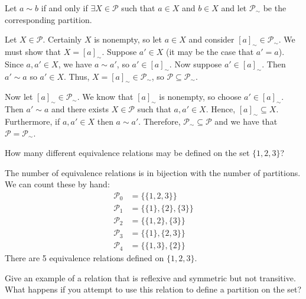 \documentclass[../../master.tex]{subfiles}
\begin{document}
  \begin{solution}
    Let \(a \sim b\) if and only if \(\exists X \in \mathscr{P}\) such that \(a
    \in X\) and \(b \in X\) and let \(\mathscr{P}_{\sim}\) be the corresponding
    partition.

    Let \(X \in \mathscr{P}\). Certainly \(X\) is nonempty, so let \(a \in X\)
    and consider \([a]_{\sim} \in \mathscr{P}_{\sim}\). We must show that \(X =
    [a]_{\sim}\). Suppose \(a' \in X\) (it may be the case that \(a' = a\)).
    Since \(a, a' \in X\), we have \(a \sim a'\), so \(a' \in [a]_{\sim}\). Now
    suppose \(a' \in [a]_{\sim}\). Then \(a' \sim a\) so \(a' \in X\). Thus,
    \(X = [a]_{\sim} \in \mathscr{P}_{\sim}\), so \(\mathscr{P} \subseteq
    \mathscr{P}_{\sim}\).

    Now let \([a]_{\sim} \in \mathscr{P}_{\sim}\). We know that \([a]_{\sim}\) is nonempty, so choose \(a' \in [a]_{\sim}\).
    Then \(a' \sim a\) and there exists \(X \in \mathscr{P}\) such that \(a, a' \in X\). Hence, \([a]_{\sim} \subseteq X\).
    Furthermore, if \(a, a' \in X\) then \(a \sim a'\). Therefore, \(\mathscr{P}_{\sim} \subseteq \mathscr{P}\) and we have that \(\mathscr{P} = \mathscr{P}_{\sim}\).
  \end{solution}

  \begin{problem}
    How many different equivalence relations may be defined on the set \(\{1, 2, 3\}\)?
  \end{problem}

  \begin{solution}
    The number of equivalence relations is in bijection with the number of partitions. We can count these by hand:
    \begin{align*}
      \mathscr{P}_{0} &= \{ \{1, 2, 3\} \} \\
      \mathscr{P}_{1} &= \{ \{1\}, \{2\}, \{3\} \} \\
      \mathscr{P}_{2} &= \{ \{1, 2\}, \{3\} \} \\
      \mathscr{P}_{3} &= \{ \{1\}, \{2, 3\} \} \\
      \mathscr{P}_{4} &= \{ \{1, 3\}, \{2\} \}
    \end{align*}
    There are 5 equivalence relations defined on \(\{1, 2, 3\}\).
  \end{solution}

  \begin{problem}
    Give an example of a relation that is reflexive and symmetric but not transitive. What happens if you attempt to use this relation to define a partition on the set?
  \end{problem}
\end{document}
